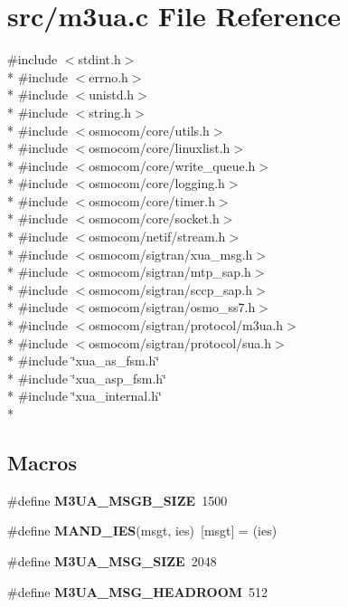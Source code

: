 \section{src/m3ua.c File Reference}
\label{m3ua_8c}
{\ttfamily \#include $<$stdint.\+h$>$}\\*
{\ttfamily \#include $<$errno.\+h$>$}\\*
{\ttfamily \#include $<$unistd.\+h$>$}\\*
{\ttfamily \#include $<$string.\+h$>$}\\*
{\ttfamily \#include $<$osmocom/core/utils.\+h$>$}\\*
{\ttfamily \#include $<$osmocom/core/linuxlist.\+h$>$}\\*
{\ttfamily \#include $<$osmocom/core/write\+\_\+queue.\+h$>$}\\*
{\ttfamily \#include $<$osmocom/core/logging.\+h$>$}\\*
{\ttfamily \#include $<$osmocom/core/timer.\+h$>$}\\*
{\ttfamily \#include $<$osmocom/core/socket.\+h$>$}\\*
{\ttfamily \#include $<$osmocom/netif/stream.\+h$>$}\\*
{\ttfamily \#include $<$osmocom/sigtran/xua\+\_\+msg.\+h$>$}\\*
{\ttfamily \#include $<$osmocom/sigtran/mtp\+\_\+sap.\+h$>$}\\*
{\ttfamily \#include $<$osmocom/sigtran/sccp\+\_\+sap.\+h$>$}\\*
{\ttfamily \#include $<$osmocom/sigtran/osmo\+\_\+ss7.\+h$>$}\\*
{\ttfamily \#include $<$osmocom/sigtran/protocol/m3ua.\+h$>$}\\*
{\ttfamily \#include $<$osmocom/sigtran/protocol/sua.\+h$>$}\\*
{\ttfamily \#include \char`\"{}xua\+\_\+as\+\_\+fsm.\+h\char`\"{}}\\*
{\ttfamily \#include \char`\"{}xua\+\_\+asp\+\_\+fsm.\+h\char`\"{}}\\*
{\ttfamily \#include \char`\"{}xua\+\_\+internal.\+h\char`\"{}}\\*
\subsection*{Macros}
\begin{DoxyCompactItemize}
\item 
\#define {\bf M3\+U\+A\+\_\+\+M\+S\+G\+B\+\_\+\+S\+I\+ZE}~1500
\item 
\#define {\bf M\+A\+N\+D\+\_\+\+I\+ES}(msgt,  ies)~[msgt] = (ies)
\item 
\#define {\bf M3\+U\+A\+\_\+\+M\+S\+G\+\_\+\+S\+I\+ZE}~2048
\item 
\#define {\bf M3\+U\+A\+\_\+\+M\+S\+G\+\_\+\+H\+E\+A\+D\+R\+O\+OM}~512
\end{DoxyCompactItemize}
